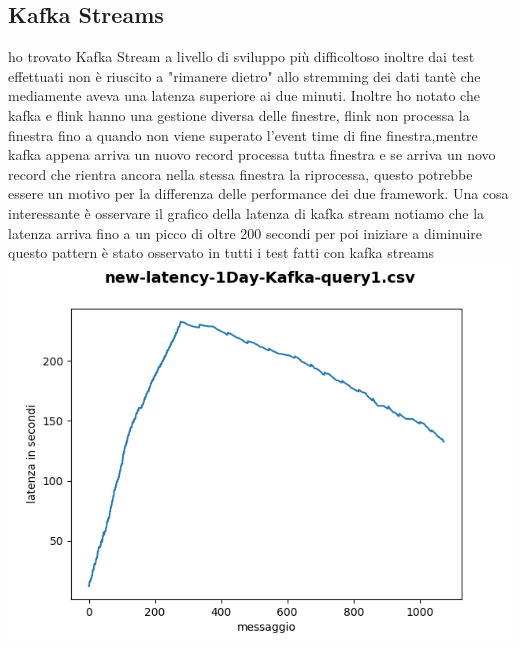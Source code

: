 \documentclass[acmsmall]{acmart}
\begin{document}
\subsection{Kafka Streams}
ho trovato Kafka Stream a livello di sviluppo più difficoltoso inoltre dai test effettuati non è riuscito a "rimanere dietro" allo stremming dei dati tantè che mediamente aveva una latenza superiore ai due minuti.
Inoltre ho notato che kafka e flink hanno una gestione diversa delle finestre, flink non processa la finestra fino a quando non viene superato l'event time di fine finestra,mentre kafka appena arriva un nuovo record processa tutta finestra e se arriva un novo record che rientra ancora nella stessa finestra la riprocessa, questo potrebbe essere un motivo per la  differenza delle performance dei due framework.
Una cosa interessante è osservare il grafico della latenza di kafka stream
notiamo che la latenza arriva fino a un picco di oltre 200 secondi per poi iniziare a diminuire 
questo pattern è stato osservato in tutti i test fatti con kafka streams
\includegraphics[width=14cm]{../results/tempi/new-latency-1Day-Kafka-query1.csv.png}

 
\end{document}
